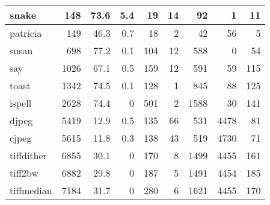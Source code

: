 \begin{tabular}{|l|r|r|r|r|r|r|r|r|}
\hline
 snake           &      148 &     73.6 &    5.4 &   19 &   14 &     92 &     1 &    11 \\
\hline
 patricia        &      149 &     46.3 &    0.7 &   18 &    2 &     42 &    56 &     5 \\
\hline
 susan           &      698 &     77.2 &    0.1 &  104 &   12 &    588 &     0 &    54 \\
\hline
 say             &     1026 &     67.1 &    0.5 &  159 &   12 &    591 &    59 &   115 \\
\hline
 toast           &     1342 &     74.5 &    0.1 &  128 &    1 &    845 &    88 &   125 \\
\hline
 ispell          &     2628 &     74.4 &    0   &  501 &    2 &   1588 &    30 &   141 \\
\hline
 djpeg           &     5419 &     12.9 &    0.5 &  135 &   66 &    531 &  4478 &    81 \\
\hline
 cjpeg           &     5615 &     11.8 &    0.3 &  138 &   43 &    519 &  4730 &    71 \\
\hline
 tiffdither      &     6855 &     30.1 &    0   &  170 &    8 &   1499 &  4455 &   161 \\
\hline
 tiff2bw         &     6882 &     29.8 &    0   &  187 &    5 &   1491 &  4454 &   185 \\
\hline
 tiffmedian      &     7184 &     31.7 &    0   &  280 &    6 &   1621 &  4455 &   170 \\
\hline
\end{tabular}


